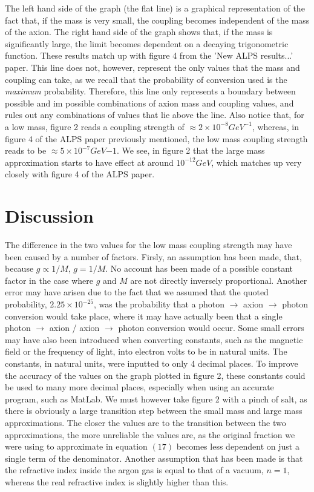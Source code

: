 \documentclass[12pt]{article}
\begin{document}
The left hand side of the graph (the flat line) is a graphical representation of the fact that, if the mass is very small, the coupling becomes independent of the mass of the axion. The right hand side of the graph shows that, if the mass is significantly large, the limit becomes dependent on a decaying trigonometric function. These results match up with figure 4 from the 'New ALPS results...' paper. This line does not, however, represent the only values that the mass and coupling can take,  as we recall that the probability of conversion used is the \textit{maximum} probability. Therefore, this line only represents a boundary between possible and im possible combinations of axion mass and coupling values, and rules out any combinations of values that lie above the line. Also notice that, for a low mass, figure 2 reads a coupling strength of $\approx 2\times 10^{-8} GeV^{-1} $, whereas, in figure 4 of the ALPS paper previously mentioned, the low mass coupling strength reads to be $\approx 5\times 10^{-7}GeV{-1}$. We see, in figure 2 that the large mass approximation starts to have effect at around $10^{-12} GeV$, which matches up very closely with figure 4 of the ALPS paper.

\section{Discussion}
\label{sec:discussion}
The difference in the two values for the low mass coupling strength may have been caused by a number of factors. Firsly, an assumption has been made, that, because $g \propto 1/M$, $g = 1/M$. No account has been made of a possible constant factor in the case where $g$ and $M$ are not directly inversely proportional.
Another error may have arisen due to the fact that we assumed that the quoted probability, $2.25 \times 10^{-25}$, was the probability that a photon $\rightarrow$ axion $\rightarrow$ photon conversion would take place, where it may have actually been that a single photon $\rightarrow$ axion / axion $\rightarrow$ photon conversion would occur. 
Some small errors may have also been introduced when converting constants, such as the magnetic field or the frequency of light, into electron volts to be in natural units. The constants, in natural units, were inputted to only 4 decimal places. To improve the accuracy of the values on the graph plotted in figure 2, these constants could be used to many more decimal places, especially when using an accurate program, such as MatLab. 
We must however take figure 2 with a pinch of salt, as there is obviously a large transition step between the small mass and large mass approximations. The closer the values are to the transition between the two approximations, the more unreliable the values are, as the original fraction we were using to approximate in equation $(17)$ becomes less dependent on just a single term of the denominator. 
Another assumption that has been made is that the refractive index inside the argon gas is equal to that of a vacuum, $n=1$, whereas the real refractive index is slightly higher than this. 
\end{document}
